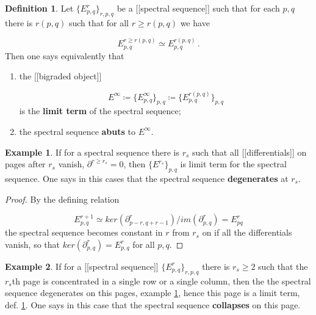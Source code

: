 \documentclass[12pt,titlepage]{article}
\theoremstyle{plain}
\theoremstyle{definition}
\newtheorem{defn}{Definition}
\newtheorem{example}{Example}
\theoremstyle{remark}
\begin{document}
\begin{defn}
\label{LimitTerm}\hypertarget{LimitTerm}{}
Let $\{E^r_{p,q}\}_{r,p,q}$ be a [[spectral sequence]] such that for each $p,q$ there is $r(p,q)$ such that for all $r \geq r(p,q)$ we have

\begin{displaymath}
E^{r \geq r(p,q)}_{p,q} \simeq E^{r(p,q)}_{p,q}
  \,.
\end{displaymath}
Then one says equivalently that

\begin{enumerate}%
\item the [[bigraded object]]

\begin{displaymath}
E^\infty 
   \coloneqq 
  \{E^\infty_{p,q}\}_{p,q} \coloneqq \{ E^{r(p,q)}_{p,q} \}_{p,q}
\end{displaymath}
is the \textbf{limit term} of the spectral sequence;


\item the spectral sequence \textbf{abuts} to $E^\infty$.



\end{enumerate}
\end{defn}
\begin{example}
\label{Degeneration}\hypertarget{Degeneration}{}
If for a spectral sequence there is $r_s$ such that all [[differentials]] on pages after $r_s$ vanish, $\partial^{r \geq r_s} = 0$, then $\{E^{r_s}\}_{p,q}$ is limit term for the spectral sequence. One says in this cases that the spectral sequence \textbf{degenerates} at $r_s$.

\end{example}
\begin{proof}
By the defining relation

\begin{displaymath}
E^{r+1}_{p,q} \simeq ker(\partial^r_{p-r,q+r-1})/im(\partial^r_{p,q}) = E^r_{pq}
\end{displaymath}
the spectral sequence becomes constant in $r$ from $r_s$ on if all the differentials vanish, so that $ker(\partial^r_{p,q}) = E^r_{p,q}$ for all $p,q$.

\end{proof}
\begin{example}
\label{Collaps}\hypertarget{Collaps}{}
If for a [[spectral sequence]] $\{E^r_{p,q}\}_{r,p,q}$ there is $r_s \geq 2$ such that the $r_s$th page is concentrated in a single row or a single column, then the the spectral sequence degenerates on this pages, example \ref{Degeneration}, hence this page is a limit term, def. \ref{LimitTerm}. One says in this case that the spectral sequence \textbf{collapses} on this page.

\end{example}
\end{document}
